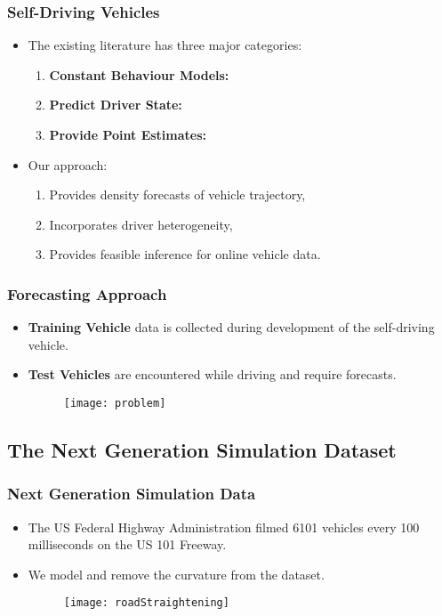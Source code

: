 \documentclass[11pt]{beamer}\usepackage[]{graphicx}\usepackage[]{color}
\begin{document}
\begin{frame}
\frametitle{Self-Driving Vehicles}
\begin{itemize}
\item The existing literature has three major categories:
\begin{enumerate}
\item \textbf{Constant Behaviour Models:} \cite{Gindele2010, Houenou2013, Bautista2017, Waymo2017}
\item \textbf{Predict Driver State:} \cite{Forbes1995, Pentland1999, Kuge2000, Gindele2010, Geng2017}
\item \textbf{Provide Point Estimates:} \cite{Wolf2008, Ding2013, Woo2016b, Geng2017, Woo2017}
\end{enumerate}
\pause
\item Our approach:
\begin{enumerate}
\item Provides density forecasts of vehicle trajectory,
\item Incorporates driver heterogeneity,
\item Provides feasible inference for online vehicle data.
\end{enumerate}
\end{itemize}
\end{frame}

\begin{frame}
\frametitle{Forecasting Approach}
\begin{itemize}
\item \textbf{Training Vehicle} data is collected during development of the self-driving vehicle.
\item \textbf{Test Vehicles} are encountered while driving and require forecasts.
\begin{figure}
\centering
\texttt{[image: problem]}
\end{figure}
\end{itemize}
\end{frame}

\subsection{The Next Generation Simulation Dataset}

\begin{frame}
\frametitle{Next Generation Simulation Data}
\begin{itemize}
\item The US Federal Highway Administration filmed 6101 vehicles every 100 milliseconds on the US 101 Freeway.
\item We model and remove the curvature from the dataset.
\begin{figure}
\centering
\texttt{[image: roadStraightening]}
\end{figure}
\end{itemize}
\end{frame}
\end{document}
